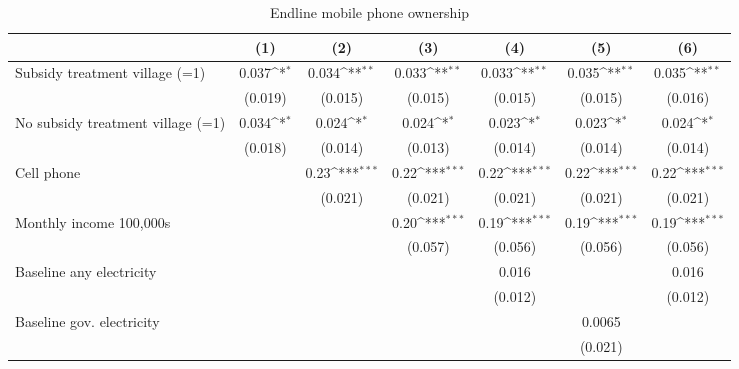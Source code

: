 \begin{table}[htbp]\centering
\def\sym#1{\ifmmode^{#1}\else\(^{#1}\)\fi}
\caption{Endline mobile phone ownership}
\begin{tabular*}{1\hsize}{@{\hskip\tabcolsep\extracolsep\fill}l*{6}{c}}
\toprule
                &\multicolumn{1}{c}{(1)}         &\multicolumn{1}{c}{(2)}         &\multicolumn{1}{c}{(3)}         &\multicolumn{1}{c}{(4)}         &\multicolumn{1}{c}{(5)}         &\multicolumn{1}{c}{(6)}         \\
\midrule
Subsidy treatment village (=1)&    0.037\sym{*}  &    0.034\sym{**} &    0.033\sym{**} &    0.033\sym{**} &    0.035\sym{**} &    0.035\sym{**} \\
                &  (0.019)         &  (0.015)         &  (0.015)         &  (0.015)         &  (0.015)         &  (0.016)         \\
No subsidy treatment village (=1)&    0.034\sym{*}  &    0.024\sym{*}  &    0.024\sym{*}  &    0.023\sym{*}  &    0.023\sym{*}  &    0.024\sym{*}  \\
                &  (0.018)         &  (0.014)         &  (0.013)         &  (0.014)         &  (0.014)         &  (0.014)         \\
Cell phone      &                  &     0.23\sym{***}&     0.22\sym{***}&     0.22\sym{***}&     0.22\sym{***}&     0.22\sym{***}\\
                &                  &  (0.021)         &  (0.021)         &  (0.021)         &  (0.021)         &  (0.021)         \\
Monthly income 100,000s&                  &                  &     0.20\sym{***}&     0.19\sym{***}&     0.19\sym{***}&     0.19\sym{***}\\
                &                  &                  &  (0.057)         &  (0.056)         &  (0.056)         &  (0.056)         \\
Baseline any electricity&                  &                  &                  &    0.016         &                  &    0.016         \\
                &                  &                  &                  &  (0.012)         &                  &  (0.012)         \\
Baseline gov. electricity&                  &                  &                  &                  &   0.0065         &                  \\
                &                  &                  &                  &                  &  (0.021)         &                  \\

\end{tabular*}
\end{table}
